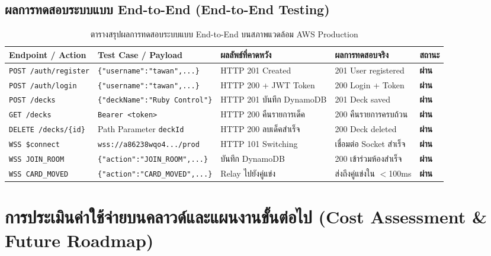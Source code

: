 \documentclass[12pt,a4paper]{article}
\begin{document}
\subsection{ผลการทดสอบระบบแบบ End-to-End (End-to-End Testing)}

\begin{table}[H]
\centering
\small
\begin{tabular}{p{3.2cm} p{4cm} p{3.2cm} p{3cm} p{1.2cm}}
\toprule
\textbf{Endpoint / Action} & \textbf{Test Case / Payload} & \textbf{ผลลัพธ์ที่คาดหวัง} & \textbf{ผลการทดสอบจริง} & \textbf{สถานะ} \\
\midrule
\texttt{POST /auth/register} & \texttt{\{"username":"tawan",...\}} & HTTP 201 Created & 201 User registered & \textbf{ผ่าน} \\
\texttt{POST /auth/login} & \texttt{\{"username":"tawan",...\}} & HTTP 200 + JWT Token & 200 Login + Token & \textbf{ผ่าน} \\
\texttt{POST /decks} & \texttt{\{"deckName":"Ruby Control"\}} & HTTP 201 บันทึก DynamoDB & 201 Deck saved & \textbf{ผ่าน} \\
\texttt{GET /decks} & \texttt{Bearer <token>} & HTTP 200 คืนรายการเด็ค & 200 คืนรายการครบถ้วน & \textbf{ผ่าน} \\
\texttt{DELETE /decks/\{id\}} & Path Parameter \texttt{deckId} & HTTP 200 ลบเด็คสำเร็จ & 200 Deck deleted & \textbf{ผ่าน} \\
\texttt{WSS \$connect} & \texttt{wss://a86238wqo4.../prod} & HTTP 101 Switching & เชื่อมต่อ Socket สำเร็จ & \textbf{ผ่าน} \\
\texttt{WSS JOIN\_ROOM} & \texttt{\{"action":"JOIN\_ROOM",...\}} & บันทึก DynamoDB & 200 เข้าร่วมห้องสำเร็จ & \textbf{ผ่าน} \\
\texttt{WSS CARD\_MOVED} & \texttt{\{"action":"CARD\_MOVED",...\}} & Relay ไปยังคู่แข่ง & ส่งถึงคู่แข่งใน $<$100ms & \textbf{ผ่าน} \\
\bottomrule
\end{tabular}
\caption{ตารางสรุปผลการทดสอบระบบแบบ End-to-End บนสภาพแวดล้อม AWS Production}
\end{table}

\newpage

\section{การประเมินค่าใช้จ่ายบนคลาวด์และแผนงานขั้นต่อไป (Cost Assessment \& Future Roadmap)}
\end{document}
